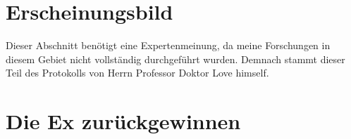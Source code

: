 \section{Erscheinungsbild}

Dieser Abschnitt benötigt eine Expertenmeinung, da meine Forschungen in diesem Gebiet nicht vollständig durchgeführt wurden.
Demnach stammt dieser Teil des Protokolls von Herrn Professor Doktor Love himself.





\section{Die Ex zurückgewinnen}








